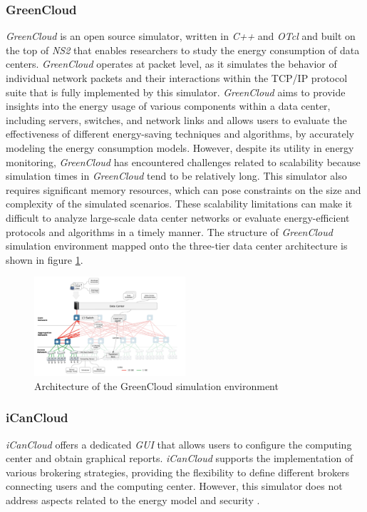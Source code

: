 {\subsubsection*{GreenCloud}
\emph{GreenCloud} \cite{kliazovich2012greencloud} is an open source simulator, written in \emph{C++} and \emph{OTcl} and built on the top of \emph{NS2} that enables researchers to study the energy consumption of data centers. \emph{GreenCloud} operates at packet level, as it simulates the behavior of individual network packets and their interactions within the TCP/IP protocol suite that is fully implemented by this simulator. \emph{GreenCloud} aims to provide insights into the energy usage of various components within a data center, including servers, switches, and network links and allows users to evaluate the effectiveness of different energy-saving techniques and algorithms, by accurately modeling the energy consumption models. However, despite its utility in energy monitoring, \emph{GreenCloud} has encountered challenges related to scalability because simulation times in \emph{GreenCloud} tend to be relatively long. This simulator also requires significant memory resources, which can pose constraints on the size and complexity of the simulated scenarios. These scalability limitations can make it difficult to analyze large-scale data center networks or evaluate energy-efficient protocols and algorithms in a timely manner. \cite{mansouri2020cloud}
The structure of \emph{GreenCloud} simulation environment mapped onto the three-tier data center architecture is shown in figure \ref{fig:greencloud_arch}. 
\begin{figure}[h]
    \centering
    \includegraphics[width=0.5\textwidth]{chapters/images/greencloud_arch.png}
    \caption{Architecture of the GreenCloud simulation environment}
    \label{fig:greencloud_arch}
\end{figure}
\subsubsection*{iCanCloud}
\emph{iCanCloud} \cite{nunez2012icancloud} offers a dedicated \emph{GUI} that allows users to configure the computing center and obtain graphical reports. \emph{iCanCloud} supports the implementation of various brokering strategies, providing the flexibility to define different brokers connecting users and the computing center. However, this simulator does not address aspects related to the energy model and security \cite{mansouri2020cloud}.
}
